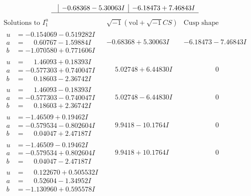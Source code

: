 \documentclass[1p]{elsarticle_modified}
\theoremstyle{definition}
\newcommand{\I}{\sqrt{-1}}
\begin{document}
$$\begin{array}{c|c|c}
 & -0.68368 - 5.30063 I & -6.18473 + 7.46843 I\\
 \hline 
 \end{array}$$\newpage$$\begin{array}{c|c|c}  
\text{Solutions to }I^u_{1}& \I (\text{vol} + \sqrt{-1}CS) & \text{Cusp shape}\\
 \hline 
\begin{aligned}
u &= -0.154069 - 0.519282 I \\
a &= \phantom{-}0.60767 - 1.59884 I \\
b &= -1.070580 + 0.771606 I\end{aligned}
 & -0.68368 + 5.30063 I & -6.18473 - 7.46843 I \\ \hline\begin{aligned}
u &= \phantom{-}1.46093 + 0.18393 I \\
a &= -0.577303 + 0.740047 I \\
b &= \phantom{-}0.18603 - 2.36742 I\end{aligned}
 & \phantom{-}5.02748 + 6.44830 I & \phantom{-0.000000 } 0 \\ \hline\begin{aligned}
u &= \phantom{-}1.46093 - 0.18393 I \\
a &= -0.577303 - 0.740047 I \\
b &= \phantom{-}0.18603 + 2.36742 I\end{aligned}
 & \phantom{-}5.02748 - 6.44830 I & \phantom{-0.000000 } 0 \\ \hline\begin{aligned}
u &= -1.46509 + 0.19462 I \\
a &= -0.579534 - 0.802604 I \\
b &= \phantom{-}0.04047 + 2.47187 I\end{aligned}
 & \phantom{-}9.9418 - 10.1764 I & \phantom{-0.000000 } 0 \\ \hline\begin{aligned}
u &= -1.46509 - 0.19462 I \\
a &= -0.579534 + 0.802604 I \\
b &= \phantom{-}0.04047 - 2.47187 I\end{aligned}
 & \phantom{-}9.9418 + 10.1764 I & \phantom{-0.000000 } 0 \\ \hline\begin{aligned}
u &= \phantom{-}0.122670 + 0.505532 I \\
a &= \phantom{-}0.52604 - 1.34952 I \\
b &= -1.130960 + 0.595578 I\end{aligned}

\end{array}$$
\end{document}
